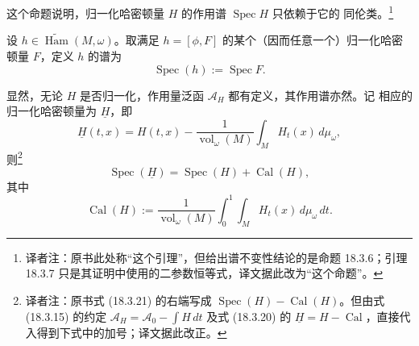 这个命题说明，归一化哈密顿量 $H$ 的作用谱 $\operatorname{Spec}H$ 只依赖于它的
同伦类。\footnote{译者注：原书此处称“这个引理”，但给出谱不变性结论的是命题
18.3.6；引理 18.3.7 只是其证明中使用的二参数恒等式，译文据此改为“这个命题”。}

\begin{definition}
\label{def:18-spectrum-hamiltonian-path-class}
设 $h\in\widetilde{\operatorname{Ham}}(M,\omega)$。取满足
$h=[\phi,F]$ 的某个（因而任意一个）归一化哈密顿量 $F$，定义 $h$ 的谱为
\[
 \operatorname{Spec}(h):=\operatorname{Spec}F.
\]
\end{definition}

显然，无论 $H$ 是否归一化，作用量泛函 $\mathcal A_H$ 都有定义，其作用谱亦然。记
相应的归一化哈密顿量为 $\underline H$，即
\begin{equation}
 \underline H(t,x)=H(t,x)-\frac1{\operatorname{vol}_\omega(M)}
 \int_M H_t(x)\,d\mu_\omega,
 \label{eq:18-hamiltonian-normalization}
\end{equation}
则\footnote{译者注：原书式 (18.3.21) 的右端写成
$\operatorname{Spec}(H)-\operatorname{Cal}(H)$。但由式 (18.3.15) 的约定
$\mathcal A_H=\mathcal A_0-\int H\,dt$ 及式 (18.3.20) 的
$\underline H=H-\operatorname{Cal}$，直接代入得到下式中的加号；译文据此改正。}
\begin{equation}
 \operatorname{Spec}(\underline H)
 =\operatorname{Spec}(H)+\operatorname{Cal}(H),
 \label{eq:18-spectrum-normalization-shift}
\end{equation}
其中
\[
 \operatorname{Cal}(H):=\frac1{\operatorname{vol}_\omega(M)}
 \int_0^1\int_M H_t(x)\,d\mu_\omega\,dt.
\]
